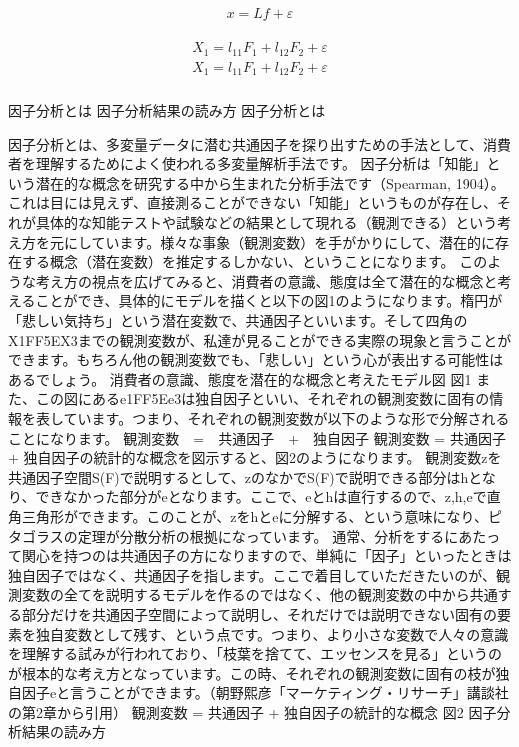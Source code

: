 \documentclass[a4j,11pt,mc, twocolumn]{jreport}
\begin{document}
		\begin{eqnarray}
		x=Lf+\varepsilon
		\end{eqnarray}

	\begin{eqnarray}
	\begin{split}
	X_1 =l_{11}F_1+l_{12}F_2+\varepsilon\\\nonumber
	X_1 =l_{11}F_1+l_{12}F_2+\varepsilon\\
	\end{split}
	\end{eqnarray}





%
%
%




	因子分析とは
	因子分析結果の読み方
	因子分析とは

	因子分析とは、多変量データに潜む共通因子を探り出すための手法として、消費者を理解するためによく使われる多変量解析手法です。
	因子分析は「知能」という潜在的な概念を研究する中から生まれた分析手法です（Spearman, 1904）。これは目には見えず、直接測ることができない「知能」というものが存在し、それが具体的な知能テストや試験などの結果として現れる（観測できる）という考え方を元にしています。様々な事象（観測変数）を手がかりにして、潜在的に存在する概念（潜在変数）を推定するしかない、ということになります。
	このような考え方の視点を広げてみると、消費者の意識、態度は全て潜在的な概念と考えることができ、具体的にモデルを描くと以下の図1のようになります。楕円が「悲しい気持ち」という潜在変数で、共通因子といいます。そして四角のX1{FF5E}X3までの観測変数が、私達が見ることができる実際の現象と言うことができます。もちろん他の観測変数でも、「悲しい」という心が表出する可能性はあるでしょう。
	消費者の意識、態度を潜在的な概念と考えたモデル図
	図1
	また、この図にあるe1{FF5E}e3は独自因子といい、それぞれの観測変数に固有の情報を表しています。つまり、それぞれの観測変数が以下のような形で分解されることになります。
	観測変数　=　共通因子　+　独自因子
	観測変数 = 共通因子 + 独自因子の統計的な概念を図示すると、図2のようになります。
	観測変数zを共通因子空間S(F)で説明するとして、zのなかでS(F)で説明できる部分はhとなり、できなかった部分がeとなります。ここで、eとhは直行するので、z,h,eで直角三角形ができます。このことが、zをhとeに分解する、という意味になり、ピタゴラスの定理が分散分析の根拠になっています。
	通常、分析をするにあたって関心を持つのは共通因子の方になりますので、単純に「因子」といったときは独自因子ではなく、共通因子を指します。ここで着目していただきたいのが、観測変数の全てを説明するモデルを作るのではなく、他の観測変数の中から共通する部分だけを共通因子空間によって説明し、それだけでは説明できない固有の要素を独自変数として残す、という点です。つまり、より小さな変数で人々の意識を理解する試みが行われており、「枝葉を捨てて、エッセンスを見る」というのが根本的な考え方となっています。この時、それぞれの観測変数に固有の枝が独自因子eと言うことができます。（朝野熙彦「マーケティング・リサーチ」講談社の第2章から引用）
	観測変数 = 共通因子 + 独自因子の統計的な概念
	図2
	因子分析結果の読み方
\end{document}
